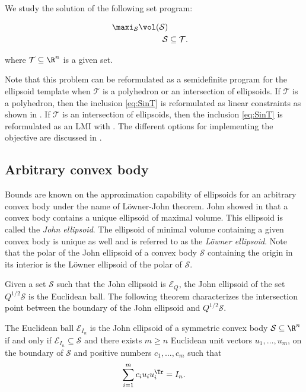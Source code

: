 \documentclass[11pt,twoside,a4paper,openright]{uclouvain-thesis}
\begin{document}
We study the solution of the following set program:
\begin{myprog}
\begin{align}
  \notag
  \maxi_{\mathcal{S}} \vol(\mathcal{S})\\
  \label{eq:SinT}
  \mathcal{S} & \subseteq \mathcal{T}.
\end{align}
\end{myprog}
where $\mathcal{T} \subseteq \R^n$ is a given set.

Note that this problem can be reformulated as a semidefinite program for the ellipsoid template
when $\mathcal{T}$ is a polyhedron or an intersection of ellipsoids.
If $\mathcal{T}$ is a polyhedron, then the inclusion \eqref{eq:SinT}
is reformulated as linear constraints as shown in .
If $\mathcal{T}$ is an intersection of ellipsoids, then the inclusion \eqref{eq:SinT}
is reformulated as an LMI with .
The different options for implementing the objective are discussed in .

\subsection{Arbitrary convex body}

Bounds are known on the approximation capability of ellipsoids
for an arbitrary convex body under the name of L\"{o}wner-John theorem.
John showed in \cite{john2014extremum} that a convex body contains a unique
ellipsoid of maximal volume.
This ellipsoid is called the \emph{John ellipsoid}.
The ellipsoid of minimal volume containing a given convex body
is unique as well and is referred to as the \emph{L\"{o}wner ellipsoid}.
Note that the polar of the John ellipsoid of a convex body $\mathcal{S}$ containing the origin
in its interior is the L\"{o}wner ellipsoid of the polar of $\mathcal{S}$.

Given a set $\mathcal{S}$ such that the John ellipsoid is
$\mathcal{E}_{Q}$, the John ellipsoid of the set $Q^{1/2}\mathcal{S}$
is the Euclidean ball.
The following theorem characterizes the intersection point
between the boundary of the John ellipsoid and $Q^{1/2}\mathcal{S}$.

\begin{mytheo}
  \label{theo:johnu}
  The Euclidean ball $\mathcal{E}_{I_n}$ is the John ellipsoid of a symmetric convex body $\mathcal{S} \subseteq \R^n$
  if and only if $\mathcal{E}_{I_n} \subseteq \mathcal{S}$ and
  there exists $m \ge n$ Euclidean unit vectors $u_1, \ldots, u_m$,
  on the boundary of $\mathcal{S}$ and positive numbers $c_1, \ldots, c_m$
  such that
  \begin{equation}
    \label{eq:johnu}
    \sum_{i=1}^m c_i u_i u_i^\Tr = I_n.
  \end{equation}
\end{mytheo}
\end{document}
